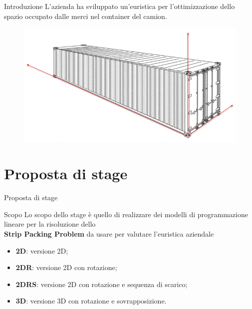 \documentclass{beamer}
\begin{document}
\begin{frame}{Introduzione}
	L'azienda ha sviluppato un'euristica per l'ottimizzazione dello spazio occupato dalle merci nel container del camion.
	\begin{figure}[H]
		\begin{center} \includegraphics[width=1\linewidth]{figures/container_arrows}
		\end{center}
	\end{figure}
\end{frame}

\section{Proposta di stage}

\begin{frame}{Proposta di stage}
	\begin{alertblock}{Scopo}
		Lo scopo dello stage \`e  quello di realizzare dei modelli di programmazione lineare per la risoluzione dello \\ \textbf{Strip Packing Problem} da usare per valutare l'euristica aziendale
	\end{alertblock}
	\begin{itemize}
		\item \textbf{2D}: versione 2D;
		\item \textbf{2DR}: versione 2D con rotazione;
		\item \textbf{2DRS}: versione 2D con rotazione e sequenza di scarico;
		\item \textbf{3D}: versione 3D con rotazione e sovrapposizione.
	\end{itemize}
\end{frame}
\end{document}
